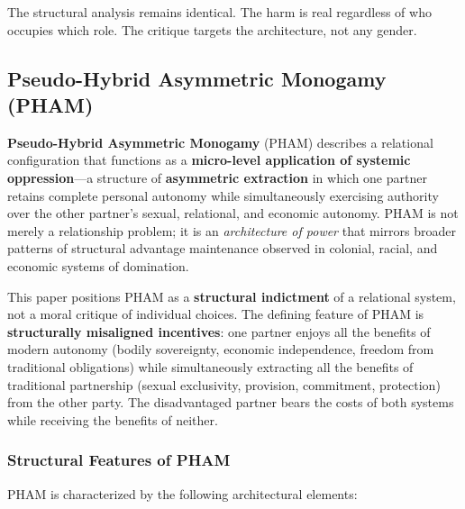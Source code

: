 \documentclass[12pt, letterpaper]{article}
\begin{document}
The structural analysis remains identical. The harm is real regardless of who occupies which role. The critique targets the architecture, not any gender.

\subsection{Pseudo-Hybrid Asymmetric Monogamy (PHAM)}

\textbf{Pseudo-Hybrid Asymmetric Monogamy} (PHAM) describes a relational configuration that functions as a \textbf{micro-level application of systemic oppression}---a structure of \textbf{asymmetric extraction} in which one partner retains complete personal autonomy while simultaneously exercising authority over the other partner's sexual, relational, and economic autonomy. PHAM is not merely a relationship problem; it is an \textit{architecture of power} that mirrors broader patterns of structural advantage maintenance observed in colonial, racial, and economic systems of domination.

This paper positions PHAM as a \textbf{structural indictment} of a relational system, not a moral critique of individual choices. The defining feature of PHAM is \textbf{structurally misaligned incentives}: one partner enjoys all the benefits of modern autonomy (bodily sovereignty, economic independence, freedom from traditional obligations) while simultaneously extracting all the benefits of traditional partnership (sexual exclusivity, provision, commitment, protection) from the other party. The disadvantaged partner bears the costs of both systems while receiving the benefits of neither.

\subsubsection{Structural Features of PHAM}

PHAM is characterized by the following architectural elements:
\end{document}
